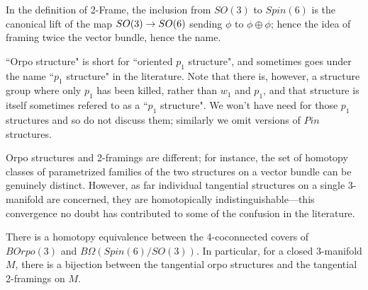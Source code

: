 \documentclass{amsart}
\begin{document}
\nid In the definition of 2-Frame, the inclusion from $SO(3)$ to $Spin(6)$ is the canonical lift of the map $SO(3) \rightarrow SO(6)$ sending $\phi$ to $\phi \oplus \phi$; hence the idea of framing twice the vector bundle, hence the name.

\begin{remark}
``Orpo structure" is short for ``oriented $p_1$ structure", and sometimes goes under the name ``$p_1$ structure" in the literature.  Note that there is, however, a structure group where only $p_1$ has been killed, rather than $w_1$ and $p_1$, and that structure is itself sometimes refered to as a ``$p_1$ structure".  We won't have need for those $p_1$ structures and so do not discuss them; similarly we omit versions of $Pin$ structures.
\end{remark}

Orpo structures and 2-framings are different; for instance, the set of homotopy classes of parametrized families of the two structures on a vector bundle can be genuinely distinct.  However, as far individual tangential structures on a single 3-manifold are concerned, they are homotopically indistinguishable---this convergence no doubt has contributed to some of the confusion in the literature.
\begin{proposition}
There is a homotopy equivalence between the 4-coconnected covers of $BOrpo(3)$ and $B\Omega(Spin(6)/SO(3))$.  In particular, for a closed 3-manifold $M$, there is a bijection between the tangential orpo structures and the tangential 2-framings on $M$.
\end{proposition}

\end{document}
